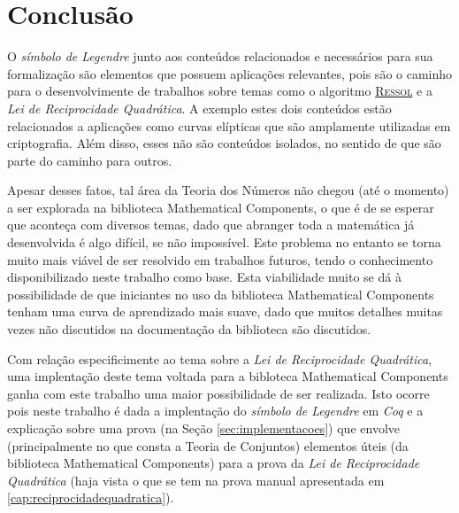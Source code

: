 \chapter{Conclusão}
\label{cap:conclusao}

O \textit{símbolo de Legendre} junto aos conteúdos relacionados e necessários para sua formalização são elementos que possuem aplicações relevantes, pois são o caminho para o desenvolvimente de trabalhos sobre temas como o algoritmo \hyperref[algo:ressol]{\textsc{Ressol}} e a \textit{Lei de Reciprocidade Quadrática}. A exemplo estes dois conteúdos estão relacionados a aplicações como curvas elípticas que são amplamente utilizadas em criptografia. Além disso, esses não são conteúdos isolados, no sentido de que são parte do caminho para outros.

Apesar desses fatos, tal área da Teoria dos Números não chegou (até o momento) a ser explorada na biblioteca Mathematical Components, o que é de se esperar que aconteça com diversos temas, dado que abranger toda a matemática já desenvolvida é algo difícil, se não impossível. Este problema no entanto se torna muito mais viável de ser resolvido em trabalhos futuros, tendo o conhecimento disponibilizado neste trabalho como base. Esta viabilidade muito se dá à possibilidade de que iniciantes no uso da biblioteca Mathematical Components tenham uma curva de aprendizado mais suave, dado que muitos detalhes muitas vezes não discutidos na documentação da biblioteca são discutidos.

Com relação especificimente ao tema sobre a \textit{Lei de Reciprocidade Quadrática}, uma implentação deste tema voltada para a bibloteca Mathematical Components ganha com este trabalho uma maior possibilidade de ser realizada. Isto ocorre pois neste trabalho é dada a implentação do \textit{símbolo de Legendre} em \textit{Coq} e a explicação sobre uma prova (na Seção \ref{sec:implementacoes}) que envolve (principalmente no que consta a Teoria de Conjuntos) elementos úteis (da biblioteca Mathematical Components) para a prova da \textit{Lei de Reciprocidade Quadrática} (haja vista o que se tem na prova manual apresentada em \ref{cap:reciprocidadequadratica}).

